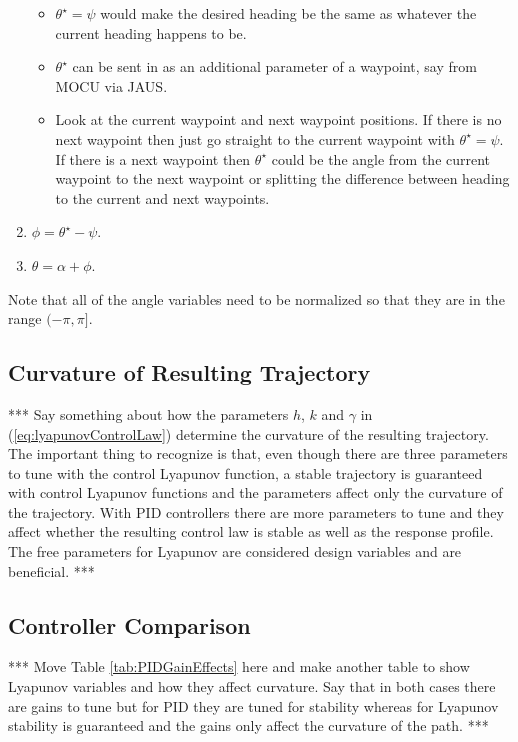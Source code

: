 \begin{enumerate}
\begin{itemize}
\item $\theta^\star=\psi$ would make the desired heading be the same as whatever the current heading happens to be.
\item $\theta^\star$ can be sent in as an additional parameter of a waypoint, say from MOCU via JAUS.
\item Look at the current waypoint and next waypoint positions. If there is no next waypoint then just go straight to the current waypoint with $\theta^\star=\psi$. If there is a next waypoint then $\theta^\star$ could be the angle from the current waypoint to the next waypoint or splitting the difference between heading to the current and next waypoints.
\end{itemize}
\item $\phi=\theta^\star-\psi$.
\item $\theta=\alpha + \phi$.
\end{enumerate}
Note that all of the angle variables need to be normalized so that they are in the range $(-\pi,\pi]$.

\subsection{Curvature of Resulting Trajectory}
\label{sec:trajectoryCurvature}
*** Say something about how the parameters $h$, $k$ and $\gamma$ in (\ref{eq:lyapunovControlLaw}) determine the curvature of the resulting trajectory. The important thing to recognize is that, even though there are three parameters to tune with the control Lyapunov function, a stable trajectory is guaranteed with control Lyapunov functions and the parameters affect only the curvature of the trajectory. With PID controllers there are more parameters to tune and they affect whether the resulting control law is stable as well as the response profile. The free parameters for Lyapunov are considered design variables and are beneficial. ***

\subsection{Controller Comparison}
\label{sec:controllerComparison}
*** Move Table \ref{tab:PIDGainEffects} here and make another table to show Lyapunov variables and how they affect curvature. Say that in both cases there are gains to tune but for PID they are tuned for stability whereas for Lyapunov stability is guaranteed and the gains only affect the curvature of the path. ***
